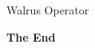 \documentclass[aspectratio=169,xcolor=dvipsnames]{beamer}
\begin{document}
\begin{frame}{Walrus Operator}
  \begin{example}
  
  \end{example}
\end{frame}


\begin{frame}
    \Huge{\centerline{\textbf{The End}}}
\end{frame}

\end{document}
